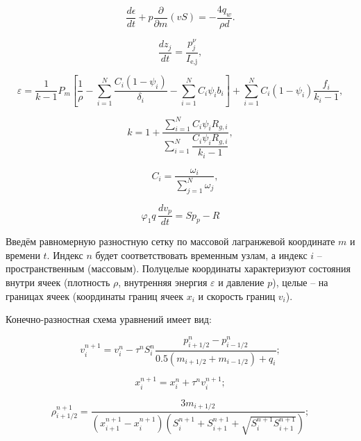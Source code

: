\documentclass[14pt, a4paper]{extreport} %
\begin{document}
\begin{equation}
\frac{d\epsilon}{dt} + p\frac{\partial}{\partial m}(vS) = -\frac{4q_w}{\rho d}.
\end{equation}

\begin{equation}
\frac{dz_j}{dt} = \frac{p^\nu_j}{I_{\text{e,j}}}, 
\end{equation}

\begin{equation}
\varepsilon = \frac{1}{k-1} P_m \left[ \frac{1}{\rho} - \sum_{i=1}^N \frac{C_i (1 - \psi_i)}{\delta_i} - \sum_{i=1}^N C_i \psi_i b_i \right] + \sum_{i=1}^N C_i (1 - \psi_i) \frac{f_i}{k_i - 1}, 
\end{equation}

\begin{equation}
k = 1 + \frac{\sum_{i=1}^N C_i \psi_i R_{g,i}}{\sum_{i=1}^N \dfrac{C_i \psi_i R_{g,i}}{k_i - 1}},
\end{equation}

\begin{equation}
\quad C_i = \frac{\omega_i}{\sum_{j=1}^N \omega_j},
\end{equation}

\begin{equation}
\varphi_1 q \, \dfrac{d v_{p}}{d t} = S p_{p} - R
\end{equation}


Введём равномерную разностную сетку по массовой лагранжевой координате $m$ и времени $t$. Индекс $n$ будет соответствовать временным узлам, а индекс $i$ -- пространственным (массовым). Полуцелые координаты характеризуют состояния внутри ячеек (плотность $\rho$, внутренняя энергия $\varepsilon$ и давление $p$), целые -- на границах ячеек (координаты границ ячеек $x_i$ и скорость границ $v_i$).

Конечно-разностная схема уравнений имеет вид: 

\begin{equation}
v_i^{n+1} = v_i^n - \tau^n S_i^n \frac{p_{i+1/2}^n - p_{i-1/2}^n}{0.5 (m_{i+1/2} + m_{i-1/2}) + q_i};
\end{equation}

\begin{equation}
x_i^{n+1} = x_i^n + \tau^n v_i^{n+1};
\end{equation}

\begin{equation}
\rho_{i+1/2}^{n+1} = \frac{3m_{i+1/2}}{(x_{i+1}^{n+1} - x_i^{n+1}) (S_i^{n+1} + S_{i+1}^{n+1} + \sqrt{S_i^{n+1} S_{i+1}^{n+1}})};
\end{equation}
\end{document}
